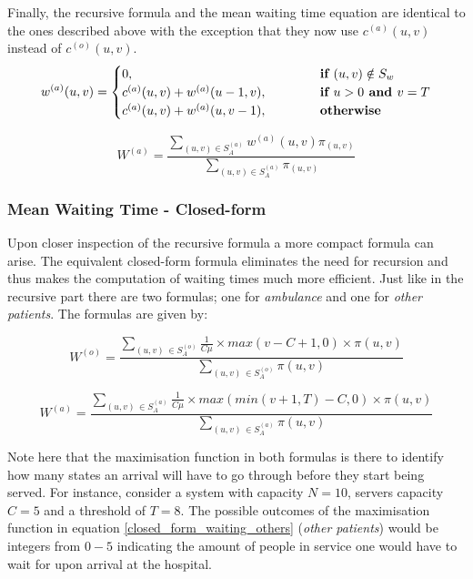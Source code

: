 Finally, the recursive formula and the mean waiting time equation are identical to the ones described above with the exception that they now use \(c^{(a)}(u,v)\) instead of \(c^{(o)}(u,v)\).
\begin{equation}
    w^{(a)}(u,v) = 
    \begin{cases} 
        0, \hspace{4.85cm} & \textbf{if } (u,v) \notin S_w \\
        c^{(a)}(u,v) + w^{(a)}(u-1, v), & \textbf{if } u > 0 \textbf{ and } v = T \\
        c^{(a)}(u,v) + w^{(a)}(u, v-1), & \textbf{otherwise}
    \end{cases}
\end{equation}

\begin{equation}
    W^{(a)} = \frac{\sum_{(u,v) \in S_A^{(a)}} w^{(a)}(u,v) \pi_{(u,v)}}{\sum_{(u,v) \in S_A^{(a)}} \pi_{(u,v)}}
\end{equation}

\subsubsection{Mean Waiting Time - Closed-form}
Upon closer inspection of the recursive formula a more compact formula can arise. The equivalent closed-form formula eliminates the need for recursion and thus makes the computation of waiting times much more efficient. Just like in the recursive part there are two formulas; one for \textit{ambulance} and one for \textit{other patients}. The formulas are given by:

\begin{equation} \label{closed_form_waiting_others}
    W^{(o)} = \frac{\sum_{(u,v) \, \in S_A^{(o)}} \frac{1}{C \mu} \times max(v-C+1,0) \times \pi(u,v)}{\sum_{(u,v) \, \in S_A^{(o)}} \pi(u,v)}
\end{equation}
    
\begin{equation}\label{closed_form_waiting_ambulance}
    W^{(a)} = \frac{\sum_{(u,v) \, \in S_A^{(a)}} \frac{1}{C \mu} \times max(min(v+1,T)-C,0) \times \pi(u,v)}{\sum_{(u,v) \, \in S_A^{(a)}} \pi(u,v)}
\end{equation}

Note here that the maximisation function in both formulas is there to identify how many states an arrival will have to go through before they start being served. For instance, consider a system with capacity \(N=10\), servers capacity \(C=5\) and a threshold of \(T=8\). The possible outcomes of the maximisation function in equation \ref{closed_form_waiting_others} (\textit{other patients}) would be integers from \( 0 - 5 \) indicating the amount of people in service one would have to wait for upon arrival at the hospital.

